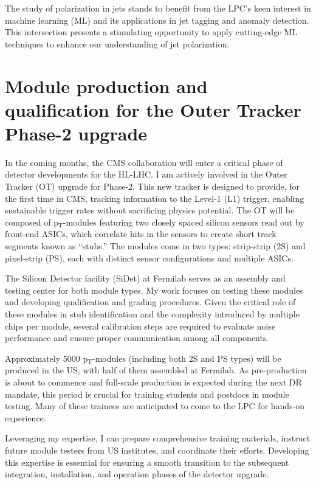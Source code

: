 {\begin{flushleft}
The study of polarization in jets stands to benefit from the LPC's keen interest in machine learning (ML) and its applications in jet tagging and anomaly detection. This intersection presents a stimulating opportunity to apply cutting-edge ML techniques to enhance our understanding of jet polarization.

\vspace{\baselineskip}
\section{Module production and qualification for the Outer Tracker Phase-2 upgrade}
In the coming months, the CMS collaboration will enter a critical phase of detector developments for the HL-LHC.  I am actively involved in the Outer Tracker (OT) upgrade for Phase-2. This new tracker is designed to provide, for the first time in CMS, tracking information to the Level-1 (L1) trigger, enabling sustainable trigger rates without sacrificing physics potential. The OT will be composed of p$_{\mathrm{T}}$-modules featuring two closely spaced silicon sensors read out by front-end ASICs, which correlate hits in the sensors to create short track segments known as ``stubs.'' The modules come in two types: strip-strip (2S) and pixel-strip (PS), each with distinct sensor configurations and multiple ASICs.


The Silicon Detector facility (SiDet) at Fermilab serves as an assembly and testing center for both module types. My work focuses on testing these modules and developing qualification and grading procedures. Given the critical role of these modules in stub identification and the complexity introduced by multiple chips per module, several calibration steps are required to evaluate noise performance and ensure proper communication among all components.

Approximately 5000 p$_{\mathrm{T}}$-modules (including both 2S and PS types) will be produced in the US, with half of them assembled at Fermilab. As pre-production is about to commence and full-scale production is expected during the next DR mandate, this period is crucial for training students and postdocs in module testing. Many of these trainees are anticipated to come to the LPC for hands-on experience.

Leveraging my expertise, I can prepare comprehensive training materials, instruct future module testers from US institutes, and coordinate their efforts. Developing this expertise is essential for ensuring a smooth transition to the subsequent integration, installation, and operation phases of the detector upgrade.


\end{flushleft}}
